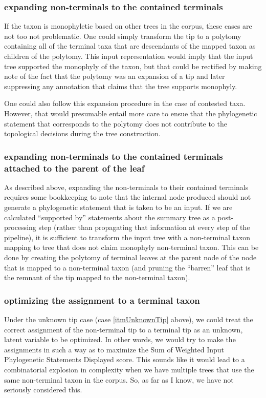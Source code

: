 \documentclass[11pt]{article}
\newcommand{\ps}{phylogenetic statement\xspace}
\newcommand{\PSs}{Phylogenetic Statements\xspace}
\newcommand{\SWIPSD}{Sum of Weighted Input \PSs Displayed\xspace}
\begin{document}
\subsubsection{expanding non-terminals to the contained terminals}
If the taxon is monophyletic based on other trees in the corpus, these cases are not too not problematic.
One could simply transform the tip to a polytomy containing all of the terminal taxa that are
    descendants of the mapped taxon as children of the polytomy.
This input representation would imply that the input tree supported the monophyly of the taxon, but 
    that could be rectified by making note of the fact that the polytomy was an expansion of a tip
    and later suppressing any annotation that claims that the tree supports monophyly.

One could also follow this expansion procedure in the case of contested taxa.
However, that would presumable entail more care to ensue that the \ps that corresponds
    to the polytomy does not contribute to the topological decisions during the 
    tree construction.

\subsubsection{expanding non-terminals to the contained terminals attached to the parent of the leaf}\label{expandNonTermPar}
As described above, expanding the non-terminals to their contained terminals requires 
    some bookkeeping to note that the internal node produced should not generate a \ps that
    is taken to be an input.
If we are calculated ``supported by'' statements about the summary tree as a post-processing step (rather
    than propagating that information at every step of the pipeline), it is sufficient
    to transform the input tree with a non-terminal taxon mapping to tree that does not
    claim monophyly non-terminal taxon.
This can be done by creating the polytomy of terminal leaves at the parent node of the node that is
    mapped to a non-terminal taxon (and pruning the ``barren'' leaf that is the remnant of the tip
    mapped to the non-terminal taxon).

\subsubsection{optimizing the assignment to a terminal taxon}
Under the unknown tip case (case \ref{itmUnknownTip} above), we could treat the
    correct assignment of the non-terminal tip to a terminal tip as an
    unknown, latent variable to be optimized.
In other words, we would try to make the assignments in such a way as to
    maximize the \SWIPSD score.
This sounds like it would lead to a combinatorial explosion in complexity when 
    we have multiple trees that use the same non-terminal taxon in the corpus.
So, as far as I know, we have not seriously considered this.
\end{document}
